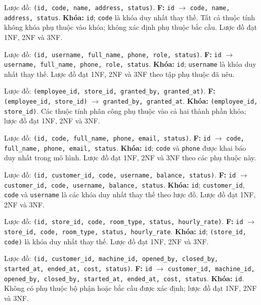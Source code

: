 \begin{description}[leftmargin=4.1cm,labelwidth=3.9cm,style=nextline]
  \item[1. \texttt{stores}] Lược đồ: \texttt{(id, code, name, address, status)}. \textbf{F:} \texttt{id} $\rightarrow$ \texttt{code, name, address, status}. \textbf{Khóa:} \texttt{id}; \texttt{code} là khóa duy nhất thay thế. Tất cả thuộc tính không khóa phụ thuộc vào khóa; không xác định phụ thuộc bắc cầu. Lược đồ đạt 1NF, 2NF và 3NF.
  \item[2. \texttt{employees}] Lược đồ: \texttt{(id, username, full\_name, phone, role, status)}. \textbf{F:} \texttt{id} $\rightarrow$ \texttt{username, full\_name, phone, role, status}. \textbf{Khóa:} \texttt{id}; \texttt{username} là khóa duy nhất thay thế. Lược đồ đạt 1NF, 2NF và 3NF theo tập phụ thuộc đã nêu.
  \item[3. \texttt{employee\_store\_assignments}] Lược đồ: \texttt{(employee\_id, store\_id, granted\_by, granted\_at)}. \textbf{F:} \texttt{(employee\_id, store\_id)} $\rightarrow$ \texttt{granted\_by, granted\_at}. \textbf{Khóa:} \texttt{(employee\_id, store\_id)}. Các thuộc tính phân công phụ thuộc vào cả hai thành phần khóa; lược đồ đạt 1NF, 2NF và 3NF.
  \item[4. \texttt{customers}] Lược đồ: \texttt{(id, code, full\_name, phone, email, status)}. \textbf{F:} \texttt{id} $\rightarrow$ \texttt{code, full\_name, phone, email, status}. \textbf{Khóa:} \texttt{id}; \texttt{code} và \texttt{phone} được khai báo duy nhất trong mô hình. Lược đồ đạt 1NF, 2NF và 3NF theo các phụ thuộc này.
  \item[5. \texttt{accounts}] Lược đồ: \texttt{(id, customer\_id, code, username, balance, status)}. \textbf{F:} \texttt{id} $\rightarrow$ \texttt{customer\_id, code, username, balance, status}. \textbf{Khóa:} \texttt{id}; \texttt{customer\_id}, \texttt{code} và \texttt{username} là các khóa duy nhất thay thế theo lược đồ. Lược đồ đạt 1NF, 2NF và 3NF.
  \item[6. \texttt{machines}] Lược đồ: \texttt{(id, store\_id, code, room\_type, status, hourly\_rate)}. \textbf{F:} \texttt{id} $\rightarrow$ \texttt{store\_id, code, room\_type, status, hourly\_rate}. \textbf{Khóa:} \texttt{id}; \texttt{(store\_id, code)} là khóa duy nhất thay thế. Lược đồ đạt 1NF, 2NF và 3NF.
  \item[7. \texttt{usage\_sessions}] Lược đồ: \texttt{(id, customer\_id, machine\_id, opened\_by, closed\_by, started\_at, ended\_at, cost, status)}. \textbf{F:} \texttt{id} $\rightarrow$ \texttt{customer\_id, machine\_id, opened\_by, closed\_by, started\_at, ended\_at, cost, status}. \textbf{Khóa:} \texttt{id}. Không có phụ thuộc bộ phận hoặc bắc cầu được xác định; lược đồ đạt 1NF, 2NF và 3NF.

\end{description}
